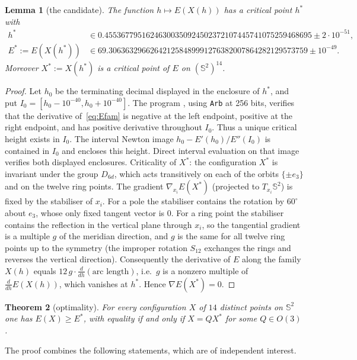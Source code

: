 \documentclass[11pt]{article}
\newtheorem{theorem}{Theorem}[section]
\newtheorem{lemma}[theorem]{Lemma}
\theoremstyle{definition}
\newcommand{\Sph}{\mathbb{S}^2}
\newcommand{\Xs}{X^{\ast}}
\newcommand{\Es}{E^{\ast}}
\newcommand{\hs}{h^{\ast}}
\begin{document}
\begin{lemma}[the candidate]\label{lem:hstar}
The function $h\mapsto E(X(h))$ has a critical point $\hs$ with
\begin{align*}
 \hs &\in 0.45536779516246300350924502372107445741075259468695 \pm 2\cdot 10^{-51},\\
 \Es:=E(X(\hs)) &\in 69.306363296626421258489991276382007864282129573759 \pm 10^{-49}.
\end{align*}
Moreover $\Xs:=X(\hs)$ is a critical point of $E$ on $(\Sph)^{14}$.
\end{lemma}
\begin{proof}
Let $h_0$ be the terminating decimal displayed in the enclosure of $\hs$, and put
$I_0=[h_0-10^{-40},h_0+10^{-40}]$. The program , using
\texttt{Arb} at 256 bits, verifies that the derivative of~\eqref{eq:Efam} is negative at the left endpoint,
positive at the right endpoint, and has positive derivative throughout $I_0$. Thus a unique critical height exists in
$I_0$. The interval Newton image
$h_0-E'(h_0)/E''(I_0)$ is contained in $I_0$ and encloses this height.
Direct interval evaluation on that image verifies both displayed enclosures.
Criticality of $\Xs$: the configuration $\Xs$ is invariant under the group $D_{6d}$, which acts transitively on each of the
orbits $\{\pm e_3\}$ and on the twelve ring points.  The gradient $\nabla_{x_i}E(\Xs)$ (projected to $T_{x_i}\Sph$) is fixed by
the stabiliser of $x_i$.  For a pole the stabiliser contains the rotation by $60^\circ$ about $e_3$, whose only fixed tangent
vector is $0$.  For a ring point the stabiliser contains the reflection in the vertical plane through $x_i$, so the tangential
gradient is a multiple $g$ of the meridian direction, and $g$ is the same for all twelve ring points up to the symmetry
(the improper rotation $S_{12}$ exchanges the rings and reverses the vertical direction).  Consequently the derivative of
$E$ along the family $X(h)$ equals $12\,g\cdot\frac{d}{dh}(\text{arc length})$, i.e.\ $g$ is a nonzero multiple of
$\frac{d}{dh}E(X(h))$, which vanishes at $\hs$.  Hence $\nabla E(\Xs)=0$.
\end{proof}

\begin{theorem}[optimality]\label{thm:main}
For every configuration $X$ of $14$ distinct points on $\Sph$ one has $E(X)\ge\Es$, with equality if and only if
$X=Q\Xs$ for some $Q\in O(3)$.
\end{theorem}

The proof combines the following statements, which are of independent interest.
\end{document}
